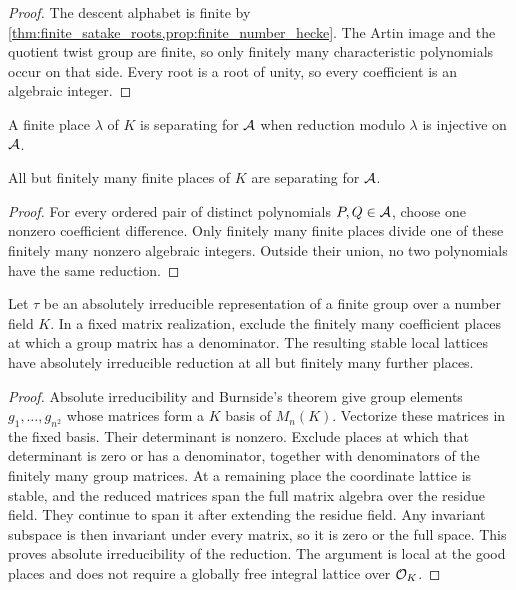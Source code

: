 \begin{proof}
The descent alphabet is finite by \cref{thm:finite_satake_roots,prop:finite_number_hecke}. The Artin image and the quotient twist group are finite, so only finitely many characteristic polynomials occur on that side. Every root is a root of unity, so every coefficient is an algebraic integer.
\end{proof}

\begin{definition}\label{def:separating_prime}
A finite place \(\lambda\) of \(K\) is separating for \(\mathcal A\) when reduction modulo \(\lambda\) is injective on \(\mathcal A\).
\end{definition}

\begin{theorem}\label{thm:separating_primes}
All but finitely many finite places of \(K\) are separating for \(\mathcal A\).
\end{theorem}

\begin{proof}
For every ordered pair of distinct polynomials \(P,Q\in\mathcal A\), choose one nonzero coefficient difference. Only finitely many finite places divide one of these finitely many nonzero algebraic integers. Outside their union, no two polynomials have the same reduction.
\end{proof}

\begin{lemma}\label{lem:good_irreducible_reduction}
Let \(\tau\) be an absolutely irreducible representation of a finite group over a number field \(K\). In a fixed matrix realization, exclude the finitely many coefficient places at which a group matrix has a denominator. The resulting stable local lattices have absolutely irreducible reduction at all but finitely many further places.
\end{lemma}

\begin{proof}
Absolute irreducibility and Burnside's theorem give group elements \(g_1,\ldots,g_{n^2}\) whose matrices form a \(K\) basis of \(M_n(K)\). Vectorize these matrices in the fixed basis. Their determinant is nonzero. Exclude places at which that determinant is zero or has a denominator, together with denominators of the finitely many group matrices. At a remaining place the coordinate lattice is stable, and the reduced matrices span the full matrix algebra over the residue field. They continue to span it after extending the residue field. Any invariant subspace is then invariant under every matrix, so it is zero or the full space. This proves absolute irreducibility of the reduction. The argument is local at the good places and does not require a globally free integral lattice over \(\mathcal O_K\).
\end{proof}

